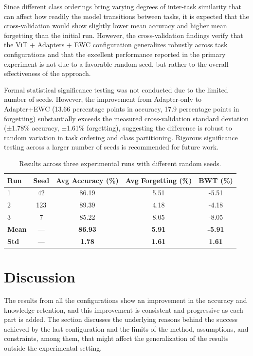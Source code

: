 \documentclass[english, LaM, oneside]{sapthesis}%
\numberwithin{equation}{chapter}
\begin{document}
Since different class orderings bring varying degrees of inter-task similarity that can affect how readily the model transitions between tasks, it is expected that the cross-validation would show slightly lower mean accuracy and higher mean forgetting than the initial run. However, the cross-validation findings verify that the ViT + Adapters + EWC configuration generalizes robustly across task configurations and that the excellent performance reported in the primary experiment is not due to a favorable random seed, but rather to the overall effectiveness of the approach. 

Formal statistical significance testing was not conducted due to the limited number of seeds. However, the improvement from Adapter-only to Adapter+EWC (13.66 percentage points in accuracy, 17.9 percentage points in forgetting) substantially exceeds the measured cross-validation standard deviation (±1.78\% accuracy, ±1.61\% forgetting), suggesting the difference is robust to random variation in task ordering and class partitioning. Rigorous significance testing across a larger number of seeds is recommended for future work.

\begin{table}[h]
\centering
\caption{Results across three experimental runs with different random seeds.}
\label{tab:multi_run_results}
\small
\renewcommand{\arraystretch}{1.2}
\begin{tabular*}{\textwidth}{@{\extracolsep{\fill}}lcccc@{}}
\toprule
\textbf{Run} & \textbf{Seed} & \textbf{Avg Accuracy (\%)} & \textbf{Avg Forgetting (\%)} & \textbf{BWT (\%)} \\
\midrule
1        & 42  & 86.19 & 5.51 & -5.51 \\
2        & 123 & 89.39 & 4.18 & -4.18 \\
3        & 7   & 85.22 & 8.05 & -8.05 \\
\midrule
\textbf{Mean} & --- & \textbf{86.93} & \textbf{5.91} & \textbf{-5.91} \\
\textbf{Std}  & --- & \textbf{1.78}  & \textbf{1.61} & \textbf{1.61} \\
\bottomrule
\end{tabular*}
\end{table}

\section{Discussion}
\label{sec:5.5}
The results from all the configurations show an improvement in the accuracy and knowledge retention, and this improvement is consistent and progressive as each part is added. The section discusses the underlying reasons behind the success achieved by the last configuration and the limits of the method, assumptions, and constraints, among them, that might affect the generalization of the results outside the experimental setting.
\end{document}
